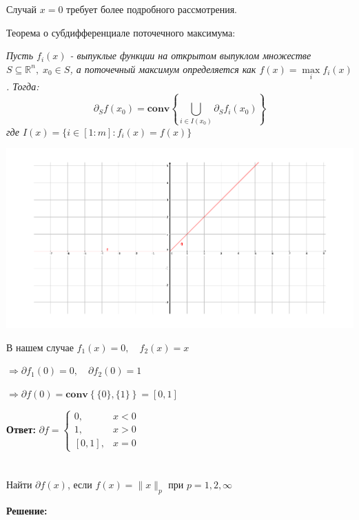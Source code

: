 \documentclass[a4paper,12pt]{article}
\newcommand{\lt}{\left}
\newcommand{\rt}{\right}
\newcommand{\p}{\partial}
\newcommand{\mbf}{\mathbf}
\begin{document}
Случай $x = 0$ требует более подробного рассмотрения.

Теорема о субдифференциале поточечного максимума:

\textit{
Пусть $f_i(x)$ - выпуклые функции на открытом выпуклом множестве $S  \subseteq \mathbb{R}^n, \; x_0 \in S$, а поточечный максимум определяется как $f(x)  = \underset{i}{\operatorname{max}} f_i(x)$. Тогда:
$$\partial_S f(x_0) = \mathbf{conv}\left\{  \bigcup\limits_{i \in I(x_0)} \partial_S f_i(x_0) \right\}$$
где $I(x) = \{ i \in [1:m]: f_i(x) = f(x)\}$
}

\includegraphics[width=\textwidth]{image1.pdf}

В нашем случае $f_1(x) = 0, \quad f_2(x) = x$ 

$\Rightarrow \p f_1(0) = 0, \quad \p f_2(0) = 1 $


$\Rightarrow \p f(0) = \mbf {conv} \lt\{ \{0\},\{1\} \rt\} = [0, 1]$


\textbf{Ответ:}
$\p f = 
\begin{cases}
0,& x < 0\\
1,& x > 0\\
[0,1],& x = 0
\end{cases}
$

\section{}

Найти $\partial f(x)$, если $f(x) = \|x\|_p$ при $p = 1,2, \infty$

\vspace{\baselineskip}

\textbf{Решение:}
\end{document}
